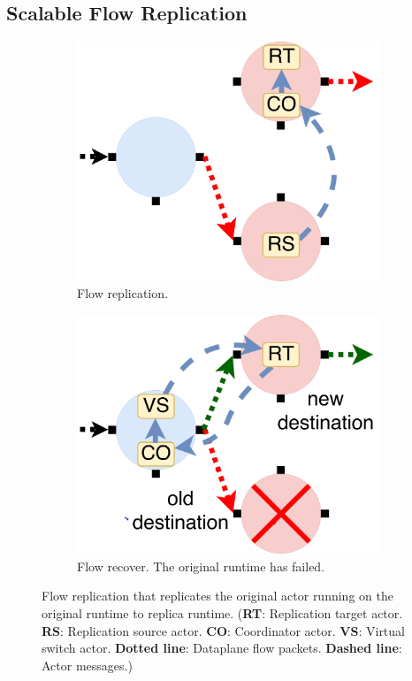 \subsection{Scalable Flow Replication}

\begin{figure}[!h]
\begin{subfigure}[t]{0.49\linewidth}
   \centering
   \includegraphics[width=0.66\columnwidth]{figure/nfactor-replication.pdf}
   \caption{Flow replication.}\label{fig:rep}
  \end{subfigure}
  \begin{subfigure}[t]{0.49\linewidth}
     \centering
     \includegraphics[width=0.66\columnwidth]{figure/nfactor-recover.pdf}
     \caption{Flow recover. The original runtime has failed.}\label{fig:recover}
    \end{subfigure}
 \caption{Flow replication that replicates the original actor running on the original runtime to replica runtime. (\textbf{RT}: Replication target actor. \textbf{RS}: Replication source actor. \textbf{CO}: Coordinator actor. \textbf{VS}: Virtual switch actor. \textbf{Dotted line}: Dataplane flow packets. \textbf{Dashed line}: Actor messages.)}
\label{fig:flow-rep}
\end{figure}

